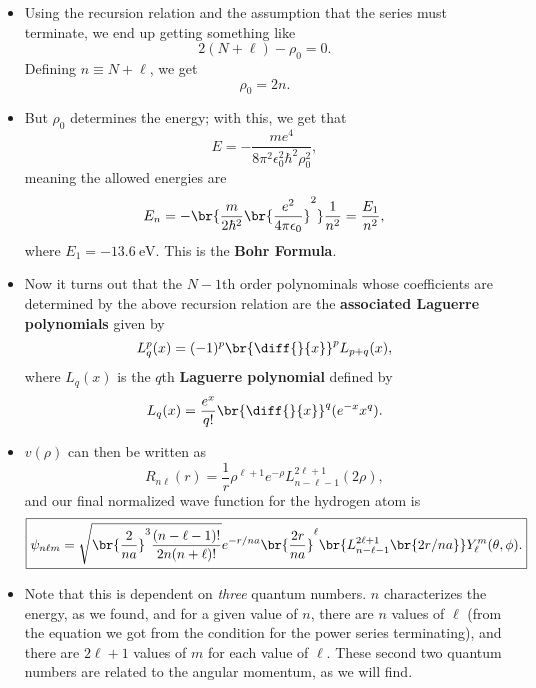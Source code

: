\begin{itemize}
    \item Using the recursion relation and the assumption that the series must terminate, we end up getting something like
        \begin{equation}
            2(N+\ell) - \rho_0 = 0.
        \end{equation}
        Defining $n \equiv N+\ell$, we get
        \begin{equation}
            \rho_0 = 2n.
        \end{equation}
    \item But $\rho_0$ determines the energy; with this, we get that
        \begin{equation}
            E = -\frac{me^4}{8\pi^2\epsilon_0^2\hbar^2\rho_0^2},
        \end{equation}
        meaning the allowed energies are
        \begin{equation}
            E_n = -\br{\frac{m}{2\hbar^2}\br{\frac{e^2}{4\pi\epsilon_0}}^2}\frac{1}{n^2} = \frac{E_1}{n^2},
        \end{equation}
        where $E_1 = -\qty{13.6}{\electronvolt}$. This is the \textbf{Bohr Formula}.
    \item Now it turns out that the $N-1$th order polynominals whose coefficients are determined by the above recursion relation are the \textbf{associated Laguerre polynomials} given by
        \begin{equation}
            L_q^p(x) = (-1)^p \br{\diff{}{x}}^p L_{p+q}(x),
        \end{equation}
        where $L_q(x)$ is the $q$th \textbf{Laguerre polynomial} defined by
        \begin{equation}
            L_q(x) = \frac{e^x}{q!}\br{\diff{}{x}}^q (e^{-x}x^q).
        \end{equation}
    \item $v(\rho)$ can then be written as
        \begin{equation}
            R_{n\ell}(r) = \frac{1}{r} \rho^{\ell+1}e^{-\rho}L_{n-\ell-1}^{2\ell+1}(2\rho),
        \end{equation}
        and our final normalized wave function for the hydrogen atom is
        \begin{equation}
            \boxed{\psi_{n\ell m} = \sqrt{\br{\frac{2}{na}}^3 \frac{(n - \ell - 1)!}{2n(n+\ell)!}}e^{-r/na} \br{\frac{2r}{na}}^{\ell}\br{L_{n-\ell-1}^{2\ell+1}\br{2r/na}}Y_{\ell}^m(\theta,\phi).}
        \end{equation}
    \item Note that this is dependent on \textit{three} quantum numbers. $n$ characterizes the energy, as we found, and for a given value of $n$, there are $n$ values of $\ell$ (from the equation we got from the condition for the power series terminating), and there are $2\ell + 1$ values of $m$ for each value of $\ell$. These second two quantum numbers are related to the angular momentum, as we will find.
\end{itemize}




